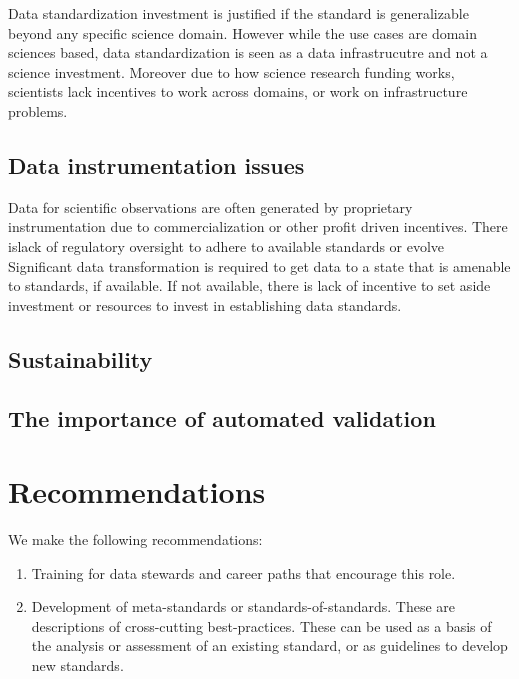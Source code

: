 \documentclass[
  letterpaper,
  DIV=11,
  numbers=noendperiod]{scrartcl}
\providecommand{\tightlist}{%
  \setlength{\itemsep}{0pt}\setlength{\parskip}{0pt}}\usepackage{longtable,booktabs,array}
\begin{document}
Data standardization investment is justified if the standard is
generalizable beyond any specific science domain. However while the use
cases are domain sciences based, data standardization is seen as a data
infrastrucutre and not a science investment. Moreover due to how science
research funding works, scientists lack incentives to work across
domains, or work on infrastructure problems.

\subsection{Data instrumentation
issues}\label{data-instrumentation-issues}

Data for scientific observations are often generated by proprietary
instrumentation due to commercialization or other profit driven
incentives. There islack of regulatory oversight to adhere to available
standards or evolve Significant data transformation is required to get
data to a state that is amenable to standards, if available. If not
available, there is lack of incentive to set aside investment or
resources to invest in establishing data standards.

\subsection{Sustainability}\label{sustainability}

\subsection{The importance of automated
validation}\label{the-importance-of-automated-validation}

\section{Recommendations}\label{recommendations}

We make the following recommendations:

\begin{enumerate}
\def\labelenumi{\arabic{enumi}.}
\tightlist
\item
  Training for data stewards and career paths that encourage this role.
\item
  Development of meta-standards or standards-of-standards. These are
  descriptions of cross-cutting best-practices. These can be used as a
  basis of the analysis or assessment of an existing standard, or as
  guidelines to develop new standards.
\end{enumerate}
\end{document}
